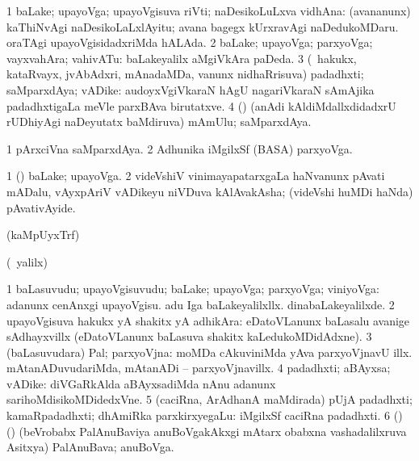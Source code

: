 {{\bentry
{}
\gl{\saMkiSx}
\expl{}
\bmng
{} 
\emng
\eentry

\bentry
{} 
\gl{\nA}
\expl{}
\bmng
\bnum
\num{1} baLake; upayoVga; upayoVgisuva riVti; naDesikoLuLxva vidhAna:  (avananunx) kaThiNvAgi naDesikoLaLxlAyitu; avana bagegx kUrxravAgi naDedukoMDaru.  oraTAgi upayoVgisidadxriMda hALAda. 
\num{2} baLake; upayoVga; parxyoVga; vayxvahAra; vahivATu:  baLakeyalilx aMgiVkAra paDeda. 
\num{3} (\kanmu\ hakukx, kataRvayx, jvAbAdxri, mAnadaMDa, \mo vanunx nidhaRrisuva) padadhxti; saMparxdAya; vADike:  audoyxVgiVkaraN hAgU nagariVkaraN sAmAjika padadhxtigaLa meVle parxBAva birutatxve. 
\num{4} (\nAyxshA) (anAdi kAldiMdallxdidadxrU rUDhiyAgi naDeyutatx baMdiruva) mAmUlu; saMparxdAya. 
\enum
\emng

\noindent
\gl{\pagu}
\expl{}
\bmng
\bnum
\num{1}  pArxciVna saMparxdAya. 
\num{2}  Adhunika iMgilxSf (BASA) parxyoVga. 
\enum
\emng
\eentry

\bentry
{} 
\gl{\nA}
\bmng
\bnum
\num{1} (\pArxparx) baLake; upayoVga. 
\num{2} videVshiV vinimayapatarxgaLa haNvanunx pAvati mADalu, vAyxpAriV vADikeyu niVDuva kAlAvakAsha; (videVshi huMDi haNda) pAvativAyide. 
\enum
\emng
\eentry

\bentry
{}
\gl{\saMkiSx}
\expl{}
\bmng
(kaMpUyxTrf)  
\emng
\eentry

\bentry
{}
\gl{\saMkiSx}
\expl{}
\bmng
{} 
\emng
\eentry

\bentry
{}
\gl{\saMkiSx}
\expl{}
\bmng
(\UK\ yalilx)  
\emng
\eentry

\bentry
{} 
\gl{\nA}
\expl{}
\bmng
\bnum
\num{1} baLasuvudu; upayoVgisuvudu; baLake; upayoVga; parxyoVga; viniyoVga:  adanunx cenAnxgi upayoVgisu.  adu Iga baLakeyalilxllx.  dinabaLakeyalilxde. 
\num{2} upayoVgisuva hakukx yA shakitx yA adhikAra:  eDatoVLanunx baLasalu avanige sAdhayxvillx (eDatoVLanunx baLasuva shakitx kaLedukoMDidAdxne). 
\num{3} (baLasuvudara) Pal; parxyoVjna:  moMDa cAkuviniMda yAva parxyoVjnavU illx.  mAtanADuvudariMda, mAtanADi -- parxyoVjnavillx. 
\num{4} padadhxti; aBAyxsa; vADike:  diVGaRkAlda aBAyxsadiMda nAnu adanunx sarihoMdisikoMDidedxVne. 
\num{5} (caciRna, ArAdhanA maMdirada) pUjA padadhxti; kamaRpadadhxti; dhAmiRka parxkirxyegaLu:  iMgilxSf caciRna padadhxti. 
\num{6} (\nAyxshA) (\ca) (beVrobabx PalAnuBaviya anuBoVgakAkxgi mAtarx obabxna vashadalilxruva Asitxya) PalAnuBava; anuBoVga. 
\enum
\emng

}}
